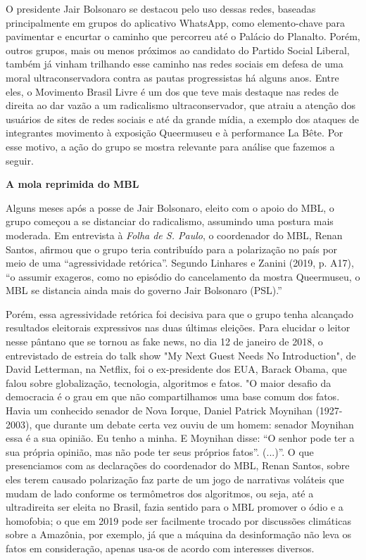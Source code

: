O presidente Jair Bolsonaro se destacou pelo uso dessas redes, baseadas
principalmente em grupos do aplicativo WhatsApp, como elemento-chave
para pavimentar e encurtar o caminho que percorreu até o Palácio do
Planalto. Porém, outros grupos, mais ou menos próximos ao candidato do
Partido Social Liberal, também já vinham trilhando esse caminho nas
redes sociais em defesa de uma moral ultraconservadora contra as pautas
progressistas há alguns anos. Entre eles, o Movimento Brasil Livre é um
dos que teve mais destaque nas redes de direita ao dar vazão a um
radicalismo ultraconservador, que atraiu a atenção dos usuários de sites
de redes sociais e até da grande mídia, a exemplo dos ataques de
integrantes movimento à exposição Queermuseu e à performance La Bête.
Por esse motivo, a ação do grupo se mostra relevante para análise que
fazemos a seguir.

\textbf{A mola reprimida do MBL}

Alguns meses após a posse de Jair Bolsonaro, eleito com o apoio do MBL,
o grupo começou a se distanciar do radicalismo, assumindo uma postura
mais moderada. Em entrevista à \emph{Folha de S. Paulo}, o coordenador
do MBL, Renan Santos, afirmou que o grupo teria contribuído para a
polarização no país por meio de uma ``agressividade retórica''. Segundo
Linhares e Zanini (2019, p. A17), ``o assumir exageros, como no episódio
do cancelamento da mostra Queermuseu, o MBL se distancia ainda mais do
governo Jair Bolsonaro (PSL).''

Porém, essa agressividade retórica foi decisiva para que o grupo tenha
alcançado resultados eleitorais expressivos nas duas últimas eleições.
Para elucidar o leitor nesse pântano que se tornou as fake news, no dia
12 de janeiro de 2018, o entrevistado de estreia do talk show "My Next
Guest Needs No Introduction", de David Letterman, na Netflix, foi o
ex-presidente dos EUA, Barack Obama, que falou sobre globalização,
tecnologia, algoritmos e fatos. "O maior desafio da democracia é o grau
em que não compartilhamos uma base comum dos fatos. Havia um conhecido
senador de Nova Iorque, Daniel Patrick Moynihan (1927-2003), que durante
um debate certa vez ouviu de um homem: senador Moynihan essa é a sua
opinião. Eu tenho a minha. E Moynihan disse: ``O senhor pode ter a sua
própria opinião, mas não pode ter seus próprios fatos''. (...)''. O que
presenciamos com as declarações do coordenador do MBL, Renan Santos,
sobre eles terem causado polarização faz parte de um jogo de narrativas
voláteis que mudam de lado conforme os termômetros dos algoritmos, ou
seja, até a ultradireita ser eleita no Brasil, fazia sentido para o MBL
promover o ódio e a homofobia; o que em 2019 pode ser facilmente trocado
por discussões climáticas sobre a Amazônia, por exemplo, já que a
máquina da desinformação não leva os fatos em consideração, apenas
usa-os de acordo com interesses diversos.

